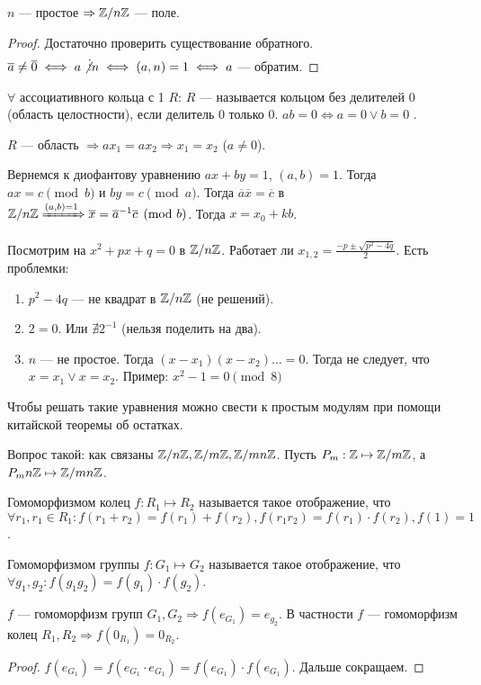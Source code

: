 \begin{consequence}
    $n$ --- простое  $\Rightarrow \mathbb{Z} / n\mathbb{Z}$ --- поле.
\end{consequence}
\begin{proof}
    Достаточно проверить существование обратного. $\overline{a} \neq \overline{0} \iff a \not\vdots n \iff (a, n) = 1 \iff a$ --- обратим.
\end{proof}
\begin{definition}
    $\forall $ ассоциативного кольца с 1 $R$:  $R$ --- называется кольцом без делителей 0 (область целостности), если делитель 0 только 0.  $ab = 0 \iff a = 0 \lor b = 0$  .
\end{definition}
 \begin{remark}
     $R$ --- область  $\Rightarrow ax_1=ax_2 \Rightarrow x_1=x_2$ ($a \neq 0$).
\end{remark}
\slashn
Вернемся к диофантову уравнению $ax+by=1$, $(a, b) = 1$. Тогда $ax = c \pmod{b}$ и  $by = c \pmod{a}$. Тогда  $\overline{a}\overline{x}=\overline{c}$ в  $\mathbb{Z} / n\mathbb{Z} \xRightarrow{(a,b)=1} \overline{x} = \overline{a}^{-1}\overline{c} \pmod{b}$. Тогда $x = x_0+kb$.

Посмотрим на $x^2+px+q=0$ в  $\mathbb{Z} / n\mathbb{Z}$. Работает ли  $x_{1,2} = \frac{-p \pm \sqrt{p^2 - 4q}}{2}$. Есть проблемки:
 \begin{enumerate}
     \item $p^2 - 4q$ --- не квадрат в  $\mathbb{Z} / n\mathbb{Z}$ (не решений).
     \item $2 = 0$. Или  $\nexists 2^{-1}$ (нельзя поделить на два).
     \item  $n$ --- не простое. Тогда  $(x-x_1)(x-x_2)\ldots=0$. Тогда не следует, что $x = x_1 \lor x = x_2$. Пример: $x^2-1=0 \pmod{8}$
\end{enumerate}
Чтобы решать такие уравнения можно свести к простым модулям при помощи китайской теоремы об остатках.

Вопрос такой: как связаны $\mathbb{Z} / n\mathbb{Z}, \mathbb{Z} / m\mathbb{Z}, \mathbb{Z} / mn\mathbb{Z}$. Пусть $P_m: \mathbb{Z} \mapsto \mathbb{Z} / m\mathbb{Z}$, а $P_mn \mathbb{Z} \mapsto \mathbb{Z} / mn\mathbb{Z}$. 

 \begin{definition}
     Гомоморфизмом колец $f: R_1 \mapsto R_2$ называется такое отображение, что $\forall r_1, r_1 \in R_1: f(r_1 + r_2) = f(r_1) + f(r_2), f(r_1r_2)=f(r_1)\cdot f(r_2), f(1) = 1$.
\end{definition}
\begin{definition}
    Гомоморфизмом группы $f: G_1 \mapsto G_2$ называется такое отображение, что $\forall g_1, g_2: f(g_1g_2) = f(g_1) \cdot f(g_2)$.
\end{definition}
\begin{remark}
    $f$ --- гомоморфизм групп  $G_1, G_2 \Rightarrow f(e_{G_1}) = e_{g_2}$.  В частности  $f$ --- гомоморфизм колец  $R_1,R_2 \Rightarrow f(0_{R_1}) = 0_{R_2}$.
\end{remark}
\begin{proof}
    $f(e_{G_1}) = f(e_{G_1} \cdot e_{G_1}) = f(e_{G_1}) \cdot f(e_{G_1})$. Дальше сокращаем.
\end{proof}
\slashn

